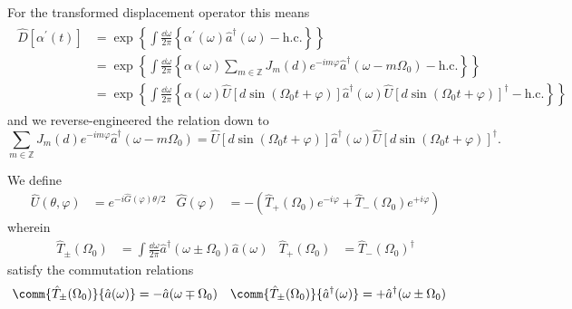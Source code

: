 For the transformed displacement operator this means
\begin{align}
	\begin{split}
		\hat{D}\left[\alpha^\prime(t)\right]
		&=
		\exp\left\{
			\int\frac{\dd{\omega}}{2\pi}
			\left\{
				\alpha^\prime(\omega)
				\hat{a}^\dagger(\omega)
				-
				\text{h.c.}
			\right\}
		\right\}
		\\
		&=
		\exp\left\{
			\int\frac{\dd{\omega}}{2\pi}
			\left\{
				\alpha(\omega)
				\sum_{m\in\mathbb{Z}}
				J_m(d)
				e^{-im\varphi}
				\hat{a}^\dagger(\omega-m\Omega_0)
				-
				\text{h.c.}
			\right\}
		\right\}
		\\
		&=
		\exp\left\{
			\int\frac{\dd{\omega}}{2\pi}
			\left\{
				\alpha(\omega)
				\hat{U}\left[d\sin(\Omega_0t+\varphi)\right]
				\hat{a}^\dagger(\omega)
				\hat{U}\left[d\sin(\Omega_0t+\varphi)\right]^\dagger
				-
				\text{h.c.}
			\right\}
		\right\}
	\end{split}	
\end{align}
and we reverse-engineered the relation down to
\begin{equation}
	\sum_{m\in\mathbb{Z}}
	J_m(d)
	e^{-im\varphi}
	\hat{a}^\dagger(\omega-m\Omega_0)
	=
	\hat{U}\left[d\sin(\Omega_0t+\varphi)\right]
	\hat{a}^\dagger(\omega)
	\hat{U}\left[d\sin(\Omega_0t+\varphi)\right]^\dagger
	.
\end{equation}

We define
\begin{align}
	\hat{U}(\theta,\varphi)
	&=
	e^{-i\hat{G}(\varphi)\theta/2}
	&
	\hat{G}(\varphi)
	&=
	-
	\left(
		\hat{T}_+(\Omega_0)
		e^{-i\varphi}
		+
		\hat{T}_-(\Omega_0)
		e^{+i\varphi}
	\right)
\end{align}
wherein
\begin{align}
	\hat{T}_\pm(\Omega_0)
	&=
	\int\frac{\dd{\omega}}{2\pi}
	\hat{a}^\dagger(\omega\pm\Omega_0)
	\hat{a}(\omega)
	&
	\hat{T}_+(\Omega_0)
	&=
	\hat{T}_-(\Omega_0)^\dagger
\end{align}
satisfy the commutation relations
\begin{align}
	\comm{\hat{T}_\pm(\Omega_0)}{\hat{a}(\omega)}
	&=
	-
	\hat{a}(\omega\mp\Omega_0)
	&
	\comm{\hat{T}_\pm(\Omega_0)}{\hat{a}^\dagger(\omega)}
	&=
	+
	\hat{a}^\dagger(\omega\pm\Omega_0)
\end{align}

